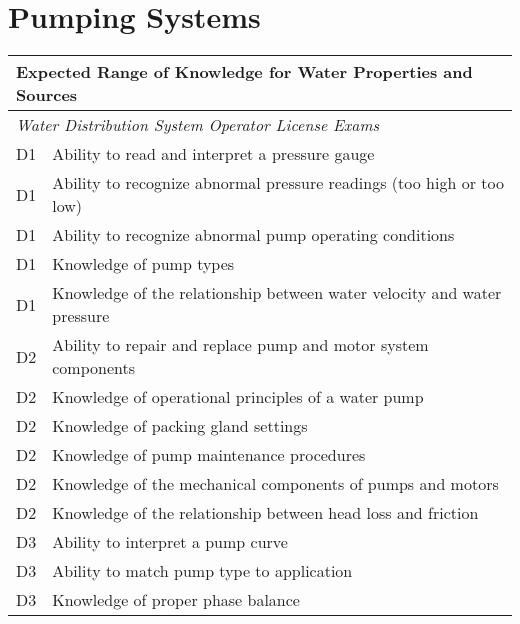 \chapter{Pumping Systems}




\begin{table}[H]
\begin{tabular}{| m{1cm} | m{15cm} |}
\hline
\multicolumn{2}{|l|}{\textbf{Expected   Range of Knowledge for Water Properties and Sources}}                                                                          \\ \hline
\multicolumn{2}{|l|}{\textit{Water   Distribution System Operator License Exams}}                                                                                      \\ \hline
D1 & Ability to read   and interpret a pressure gauge                                \\ \hline
D1 & Ability to recognize   abnormal pressure readings (too high or too low)         \\ \hline
D1 & Ability to recognize   abnormal pump operating conditions                       \\ \hline
D1 & Knowledge of pump   types                                                       \\ \hline
D1 & Knowledge of the   relationship between water velocity and water pressure       \\ \hline
D2 & Ability to repair and   replace pump and motor system components                \\ \hline
D2 & Knowledge of   operational principles of a water pump                           \\ \hline
D2 & Knowledge of packing   gland settings                                           \\ \hline
D2 & Knowledge of pump   maintenance procedures                                      \\ \hline
D2 & Knowledge of the   mechanical components of pumps and motors                    \\ \hline
D2 & Knowledge of the   relationship between head loss and friction                  \\ \hline
D3 & Ability to interpret   a pump curve                                             \\ \hline
D3 & Ability to match pump   type to application                                     \\ \hline
D3 & Knowledge of proper   phase balance                                             \\ \hline

\end{tabular}
\end{table}
\newpage



